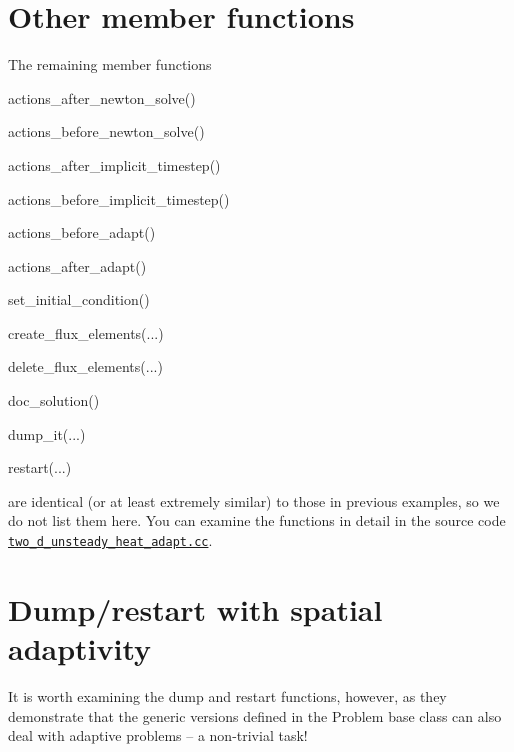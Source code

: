 \hypertarget{index_old_functions}{}\section{Other member functions}\label{index_old_functions}
The remaining member functions
\begin{DoxyItemize}
\item {\ttfamily actions\+\_\+after\+\_\+newton\+\_\+solve()} 
\item {\ttfamily actions\+\_\+before\+\_\+newton\+\_\+solve()} 
\item {\ttfamily actions\+\_\+after\+\_\+implicit\+\_\+timestep()} 
\item {\ttfamily actions\+\_\+before\+\_\+implicit\+\_\+timestep()} 
\item {\ttfamily actions\+\_\+before\+\_\+adapt()} 
\item {\ttfamily actions\+\_\+after\+\_\+adapt()} 
\item {\ttfamily set\+\_\+initial\+\_\+condition()} 
\item {\ttfamily create\+\_\+flux\+\_\+elements}(...)
\item {\ttfamily delete\+\_\+flux\+\_\+elements}(...)
\item {\ttfamily doc\+\_\+solution()} 
\item {\ttfamily dump\+\_\+it}(...)
\item {\ttfamily restart}(...)
\end{DoxyItemize}are identical (or at least extremely similar) to those in previous examples, so we do not list them here. You can examine the functions in detail in the source code \href{../../../../demo_drivers/unsteady_heat/two_d_unsteady_heat_adapt/two_d_unsteady_heat_adapt.cc}{\tt two\+\_\+d\+\_\+unsteady\+\_\+heat\+\_\+adapt.\+cc}.



 

\hypertarget{index_restart}{}\section{Dump/restart with spatial adaptivity}\label{index_restart}
It is worth examining the dump and restart functions, however, as they demonstrate that the generic versions defined in the {\ttfamily Problem} base class can also deal with adaptive problems -- a non-\/trivial task!


